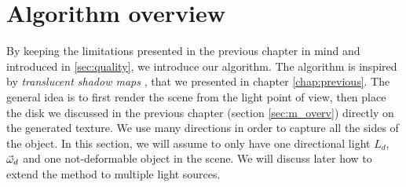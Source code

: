 %
%
%
%

\section{Algorithm overview}

By keeping the limitations presented in the previous chapter in mind and introduced in \ref{sec:quality}, we introduce our algorithm. The algorithm is inspired by \emph{translucent shadow maps} \citep{Dachsbacher:2003:TSM:882404.882433}, that we presented in chapter \ref{chap:previous}. The general idea is to first render the scene from the light point of view, then place the disk we discussed in the previous chapter (section \ref{sec:m_overv}) directly on the generated texture. We use many directions in order to capture all the sides of the object. In this section, we will assume to only have one directional light $L_d$, $\vec{\omega}_d$ and one not-deformable object in the scene. We will discuss later how to extend the method to multiple light sources.

